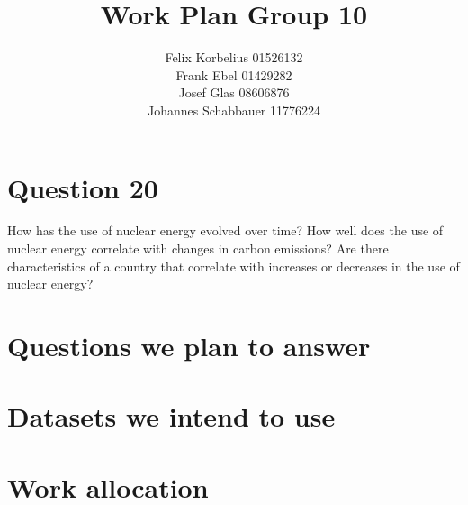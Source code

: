 \documentclass[a4paper,12pt]{article}
\author{Felix Korbelius 01526132\\Frank Ebel 01429282\\Josef Glas 08606876\\Johannes Schabbauer 11776224}
\title{Work Plan Group 10}
\begin{document}
\maketitle

\section*{Question 20}

How has the use of nuclear energy evolved over time? How well does the use of nuclear energy correlate with changes in carbon emissions? Are there characteristics of a country that correlate with increases or decreases in the use of nuclear energy?


\section*{Questions we plan to answer}


\section*{Datasets we intend to use}


\section*{Work allocation}
\end{document}
